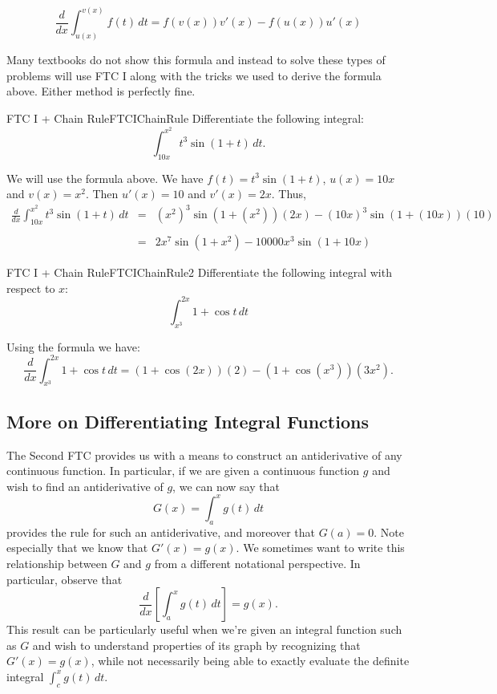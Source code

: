 \begin{formulabox}
$$\frac{d}{dx}\int_{{u(x)}}^{{v(x)}} f(t)\,dt=f({v(x)}){v'(x)}-f({u(x)}){u'(x)}$$
\end{formulabox}

Many textbooks do not show this formula and instead to solve these types of problems will use FTC I along with the tricks we used to derive the formula above.
Either method is perfectly fine.

\begin{example}{FTC I + Chain Rule}{FTCIChainRule}
Differentiate the following integral:
$$\int_{10x}^{x^2} t^3\sin(1+t) \,dt.$$
\end{example}

\begin{solution} 
We will use the formula above.
We have $f(t)=t^3\sin(1+t)$, $u(x)=10x$ and $v(x)=x^2$.
Then $u'(x)=10$ and $v'(x)=2x$.
Thus,
\begin{eqnarray*}
\frac{d}{dx}\int_{10x}^{x^2} t^3\sin(1+t) \,dt&=&(x^2)^3\sin(1+(x^2))(2x)-(10x)^3\sin(1+(10x))(10)\\
\\
&=&2x^7\sin(1+x^2)-10000x^3\sin(1+10x)
\end{eqnarray*}
\end{solution}

\begin{example}{FTC I + Chain Rule}{FTCIChainRule2}
Differentiate the following integral with respect to $x$:
$$\int_{x^3}^{2x} 1+\cos t\,dt$$
\end{example}

\begin{solution} 
Using the formula we have:
$$\frac{d}{dx}\int_{x^3}^{2x} 1+\cos t\,dt=(1+\cos(2x))(2)-(1+\cos(x^3))(3x^2).$$
\end{solution}


\subsection{More on Differentiating Integral Functions}

The Second FTC provides us with a means to construct an antiderivative of any continuous function.  In particular, if we are given a continuous function $g$ and wish to find an antiderivative of $g$, we can now say that 
$$G(x) = \int_a^x g(t) \, dt$$
provides the rule for such an antiderivative, and moreover that $G(a) = 0$.  Note especially that we know that $G'(x) = g(x)$.  We sometimes want to write this relationship between $G$ and $g$ from a different notational perspective.  In particular, observe that
\begin{equation} \label{E:diffint}
\frac{d}{dx} \left[ \int_a^x g(t) \, dt \right] = g(x).
\end{equation}
This result can be particularly useful when we're given an integral function such as $G$ and wish to understand properties of its graph by recognizing that $G'(x) = g(x)$, while not necessarily being able to exactly evaluate the definite integral $\int_c^x g(t) \, dt$.

